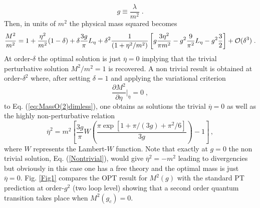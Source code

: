 \documentclass[a4paper,11pt]{article}
\def\be{\begin{equation}}
\def\ee{\end{equation}}
\def\leta{L_\eta}
\begin{document}
\be
g\equiv \frac{\lambda}{m^2} \;.
\ee
Then, in units of $m^2$ the physical mass squared becomes
\be\label{eq:MassO(2)dimless}
\frac{M^2}{m^2}= 1   + \frac{\eta^2}{m^2} (1- \delta) + \delta \frac{3g}{\pi}\leta +  \delta^2 \frac{1}{(1+\eta^2/m^2)} \left [g\frac{3 \eta^2}{\pi m^2} - g^2 \frac{9}{\pi^2} \leta - g^2 \frac{3}{2}   \right ]  + {\cal O}(\delta^3)\;.
\ee
At order-$\delta$  the optimal solution is just ${\overline \eta}=0$ implying that the trivial perturbative solution $M^2/m^2 =1$ is recovered. A non trivial result is obtained at order-$\delta^2$ where, after setting $\delta=1$ and applying the variational criterion \cite{pms1,pms2} 
\begin{equation}
\frac{\partial M^2}{\partial \eta} \Bigr |_{\overline \eta} = 0 \;,
\label{pms}
\end{equation}
to Eq. (\ref {eq:MassO(2)dimless}), one obtains as  solutions the trivial $\overline \eta =0$ as well as  the highly non-perturbative relation
\begin{equation}
{\overline \eta}^2 = m^2 \left [ \frac{3 g}{\pi} W\left ( \frac{\pi \exp[1 + \pi/{(3 g)} + \pi^2/6]} {3g }  \right ) - 1 \right ]\,,
\label {Nontrivial}
\end{equation}
where $W$ represents the Lambert-$W$ function.  Note that exactly at $g=0$ the non trivial solution, Eq. (\ref {Nontrivial}), would  give ${\overline \eta}^2 = - m^2$ leading to divergencies but obviously in this case one has a free theory and the optimal mass is just ${\overline \eta} =0$. Fig. \ref {Fig1} compares the OPT result for  $M^2(g)$ with the standard PT prediction at order-$g^2$ (two loop level) showing that a second order quantum transition takes place when $M^2(g_c)=0$. 
\end{document}
